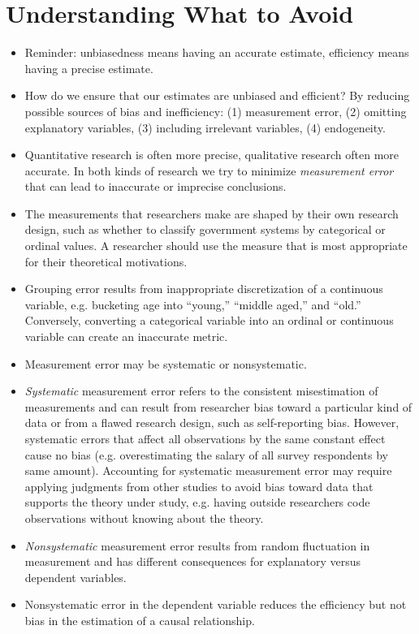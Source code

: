 \documentclass[11pt,letterpaper]{article}
\begin{document}
\section{Understanding What to Avoid}

\begin{itemize}
\item Reminder: unbiasedness means having an accurate estimate, efficiency means having a precise estimate. 
\item How do we ensure that our estimates are unbiased and efficient? By reducing possible sources of bias and inefficiency: (1) measurement error, (2) omitting explanatory variables, (3) including irrelevant variables, (4) endogeneity. 
\item Quantitative research is often more precise, qualitative research often more accurate. In both kinds of research we try to minimize \emph{measurement error} that can lead to inaccurate or imprecise conclusions.
\item The measurements that researchers make are shaped by their own research design, such as whether to classify government systems by categorical or ordinal values. A researcher should use the measure that is most appropriate for their theoretical motivations.
\item Grouping error results from inappropriate discretization of a continuous variable, e.g. bucketing age into ``young,'' ``middle aged,'' and ``old.'' Conversely, converting a categorical variable into an ordinal or continuous variable can create an inaccurate metric. 
\item Measurement error may be systematic or nonsystematic.
\item \emph{Systematic} measurement error refers to the consistent misestimation of measurements and can result from researcher bias toward a particular kind of data or from a flawed research design, such as self-reporting bias. However, systematic errors that affect all observations by the same constant effect cause no bias (e.g. overestimating the salary of all survey respondents by same amount). Accounting for systematic measurement error may require applying judgments from other studies to avoid bias toward data that supports the theory under study, e.g. having outside researchers code observations without knowing about the theory.
\item \emph{Nonsystematic} measurement error results from random fluctuation in measurement and has different consequences for explanatory versus dependent variables. 
\item Nonsystematic error in the dependent variable reduces the efficiency but not bias in the estimation of a causal relationship.

\end{itemize}
\end{document}

